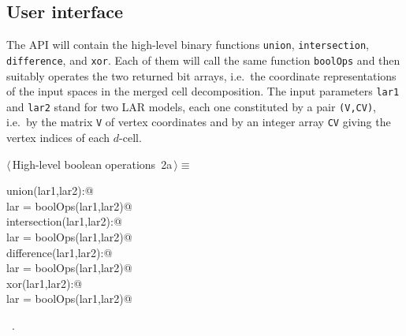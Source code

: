 \documentclass[11pt,oneside]{article}	%
\begin{document}
\subsection{User interface}

The API will contain the high-level binary functions \texttt{union}, \texttt{intersection}, \texttt{difference}, and \texttt{xor}. Each of them will call the same function \texttt{boolOps} and then suitably operates the two returned bit arrays, i.e.~the coordinate representations of the input spaces in the merged cell decomposition. The input parameters \texttt{lar1} and  \texttt{lar2} stand for two LAR models, each one constituted by a pair \texttt{(V,CV)}, i.e.~by the matrix \texttt{V} of vertex coordinates and by an integer array \texttt{CV} giving the vertex indices of each $d$-cell.

\begin{flushleft} \small \label{scrap1}
\protect{}$\langle\,$High-level boolean operations\nobreak\ {\footnotesize 2a}$\,\rangle\equiv$
\vspace{-1ex}
\begin{list}{}{} \item
\mbox{}\verb@def union(lar1,lar2):@\\
\mbox{}\verb@   lar = boolOps(lar1,lar2)@\\
\mbox{}\verb@def intersection(lar1,lar2):@\\
\mbox{}\verb@   lar = boolOps(lar1,lar2)@\\
\mbox{}\verb@def difference(lar1,lar2):@\\
\mbox{}\verb@   lar = boolOps(lar1,lar2)@\\
\mbox{}\verb@def xor(lar1,lar2):@\\
\mbox{}\verb@   lar = boolOps(lar1,lar2)@\\
\mbox{}\verb@@{\NWsep}
\end{list}
\vspace{-1ex}
\footnotesize\addtolength{\baselineskip}{-1ex}
\begin{list}{}{\setlength{\itemsep}{-\parsep}\setlength{\itemindent}{-\leftmargin}}
\item \NWtxtMacroRefIn\ .
\end{list}
\end{flushleft}
\end{document}
